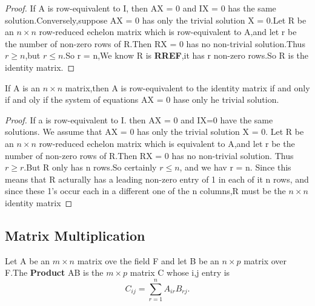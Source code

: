 \begin{proof}
   If A is row-equivalent to I, then AX = 0 and IX = 0 has the same solution.Conversely,suppose AX = 0 has only the trivial solution X = 0.Let R be an $n \times n$ row-reduced echelon matrix which is row-equivalent to A,and let r be the number of non-zero rows of R.Then RX = 0 has no non-trivial solution.Thus $r \geq n$,but $r \leq n$.So r = n,We know R is \textbf{RREF},it has r non-zero rows.So R is the identity matrix.
\end{proof}



\begin{theorem}
	If A is an $n \times n$ matrix,then A is row-equivalent to the identity matrix if and only if and oly if the system of equations AX = 0 hase only he trivial solution.
	\label{thm:row_equivalent_to_identity_matrix}
\end{theorem}

\begin{proof}
	If a is row-equivalent to I. then AX = 0 and IX=0 have the same solutions.
	We assume that AX = 0 has only the trivial solution X = 0. Let R be an $n \times n$
	row-reduced echelon matrix  which is equivalent to A,and let r be the number of non-zero rows of R.Then RX = 0 has no non-trivial solution. Thus $r \geq r$.But R only has n rows.So certainly $r \leq n$, and we hav r = n. Since this means that R acturally has a leading non-zero entry of 1 in each of it n rows, and since these 1's occur each in a different one of the n columns,R must be the $n \times n$ identity matrix
\end{proof}


\subsection{Matrix Multiplication}

\begin{definition}
	Let A be an $m \times n$ matrix ove the field F and let B be an $n \times p$ matrix over F.The \textbf{Product} AB is the $m \times p$ matrix C whose i,j entry is
	\begin{displaymath}
		C_{ij} = \sum\limits_{r = 1}^{n}A_{ir}B_{rj}.
	\end{displaymath}

\end{definition}

